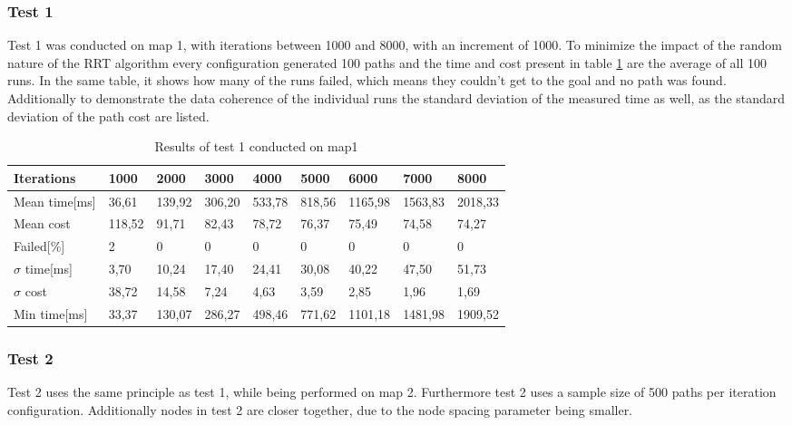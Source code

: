 \subsubsection{Test 1}
\label{sec:test1}
Test 1 was conducted on map 1, with iterations between 1000 and 8000, with an increment of 1000. To minimize the impact of the random nature of the RRT algorithm every configuration generated 100 paths and the time and cost present in table \ref{tab:pp_precision1} are the average of all 100 runs. In the same table, it shows how many of the runs failed, which means they couldn't get to the goal and no path was found. Additionally to demonstrate the data coherence of the individual runs the standard deviation of the measured time as well, as the standard deviation of the path cost are listed.   

\begin{table}[!ht]
	\centering
	\renewcommand{\arraystretch}{1.2}
	\begin{tabular}{|l||l|l|l|l|l|l|l|l|}
		\hline
		Iterations & 1000 & 2000 & 3000 & 4000 & 5000 & 6000 & 7000 & 8000 \\ \hline\hline
		Mean time[ms] & 36,61  & 139,92  & 306,20  & 533,78  & 818,56  & 1165,98  & 1563,83  & 2018,33  \\ \hline
		Mean cost & 118,52  & 91,71  & 82,43  & 78,72  & 76,37  & 75,49  & 74,58  & 74,27  \\ \hline
		Failed[\%] & 2  & 0  & 0  & 0  & 0  & 0  & 0  & 0  \\ \hline
		$\sigma$ time[ms] & 3,70  & 10,24  & 17,40  & 24,41  & 30,08  & 40,22  & 47,50  & 51,73  \\ \hline
		$\sigma$ cost & 38,72  & 14,58  & 7,24  & 4,63  & 3,59  & 2,85  & 1,96  & 1,69  \\ \hline
		Min time[ms] & 33,37  & 130,07  & 286,27  & 498,46  & 771,62  & 1101,18  & 1481,98  & 1909,52  \\ \hline
	\end{tabular}
	\label{tab:pp_precision1}
	\caption{Results of test 1 conducted on map1}
\end{table}

\subsubsection{Test 2}
\label{sec:test2}
Test 2 uses the same principle as test 1, while being performed on map 2. Furthermore test 2 uses a sample size of 500 paths per iteration configuration. Additionally nodes in test 2 are closer together, due to the node spacing parameter being smaller. 

